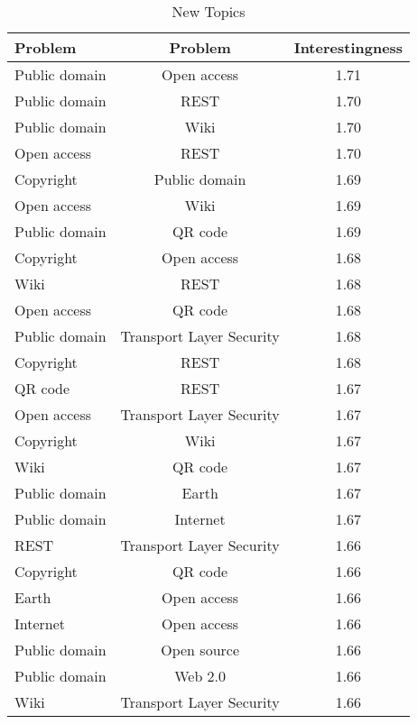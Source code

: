 \begin{table*}
\begin{centering}
\begin{tabular}{|l|c|c|}
\hline 
{Problem} & Problem & Interestingness\tabularnewline
\hline 
\hline 
Public domain & Open access & 1.71\tabularnewline
\hline 
{Public domain} & REST & 1.70\tabularnewline
\hline 
Public domain & Wiki & 1.70\tabularnewline
\hline 
Open access & REST & 1.70\tabularnewline
\hline 
Copyright & Public domain & 1.69\tabularnewline
\hline 
Open access & Wiki & 1.69\tabularnewline
\hline 
Public domain & QR code & 1.69\tabularnewline
\hline 
Copyright & Open access & 1.68\tabularnewline
\hline 
Wiki & REST & 1.68\tabularnewline
\hline 
Open access & QR code & 1.68\tabularnewline
\hline 
Public domain & Transport Layer Security & 1.68\tabularnewline
\hline 
Copyright & REST & 1.68\tabularnewline
\hline 
QR code & REST & 1.67\tabularnewline
\hline 
Open access & Transport Layer Security & 1.67\tabularnewline
\hline 
Copyright & Wiki & 1.67\tabularnewline
\hline 
Wiki & QR code & 1.67\tabularnewline
\hline 
Public domain & Earth & 1.67\tabularnewline
\hline 
Public domain & Internet & 1.67\tabularnewline
\hline 
REST & Transport Layer Security & 1.66\tabularnewline
\hline 
Copyright & QR code & 1.66\tabularnewline
\hline 
Earth & Open access & 1.66\tabularnewline
\hline 
Internet & Open access & 1.66\tabularnewline
\hline 
Public domain & Open source & 1.66\tabularnewline
\hline 
Public domain & Web 2.0 & 1.66\tabularnewline
\hline 
Wiki & Transport Layer Security & 1.66\tabularnewline
\hline 
\end{tabular}
\par\end{centering}

\caption{\label{tab:Serendipity-Topics}New Topics}
\end{table*}


